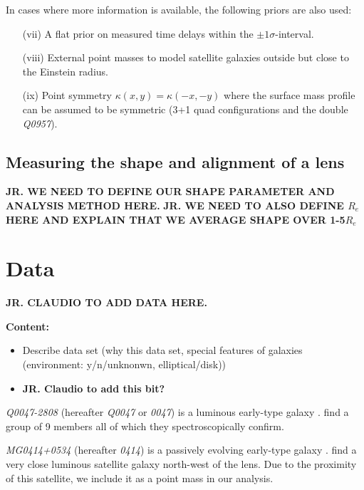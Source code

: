 \documentclass[useAMS,usenatbib]{mn2e}
\begin{document}
In cases where more information is available, the following priors are also used:

\begin{enumerate}
\item[(vii)] A flat prior on measured time delays within the $\pm 1\sigma$-interval.

\item[(viii)] External point masses to model satellite galaxies outside but
close to the Einstein radius.

\item[(ix)] Point symmetry $\kappa(x,y) = \kappa(-x,-y)$ where 
the surface mass profile can be assumed to be symmetric (3+1 quad
configurations and the double \textit{Q0957}).

\end{enumerate}

\subsection{Measuring the shape and alignment of a lens}\label{sec:shapemethod}

{\bf JR. WE NEED TO DEFINE OUR SHAPE PARAMETER AND ANALYSIS METHOD HERE.} 
{\bf JR. WE NEED TO ALSO DEFINE $R_e$ HERE AND EXPLAIN THAT WE AVERAGE SHAPE OVER 1-5$R_e$} 

\section{Data}\label{sec:data}

{\bf JR. CLAUDIO TO ADD DATA HERE.} 

\textbf{Content:}
\begin{itemize}
\item Describe data set (why this data set, special features of galaxies (environment: y/n/unknonwn, elliptical/disk))

\item {\bf JR. Claudio to add this bit?} 
\end{itemize}

\textit{Q0047-2808} (hereafter \textit{Q0047} or \textit{0047}) is a luminous early-type galaxy \citep{1996MNRAS.278..139W}. \cite{2011ApJ...726...84W} find a group of 9 members all of which they spectroscopically confirm.

\textit{MG0414+0534} (hereafter \textit{0414}) is a passively evolving early-type galaxy \citep{1999AJ....117.2034T}. \cite{1993AJ....105....1S} find a very close luminous satellite galaxy north-west of the lens. Due to the proximity of this satellite, we include it as a point mass in our analysis.
\end{document}
